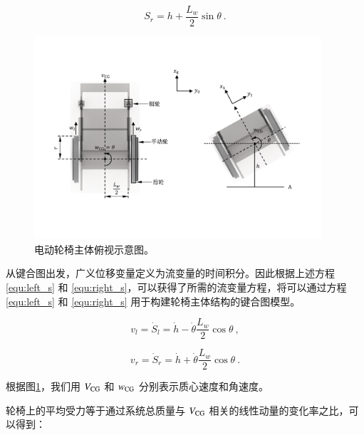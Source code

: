 	\begin{equation}
	\label{equ:right_s}
	S_r = h
	+
	\frac{L_w}{2} \sin \theta
	\ .
	\end{equation}
	
	\begin{figure}[!t]
		\centering
		\includegraphics[width=0.95\textwidth]{fig/top_view.pdf}
		\caption{电动轮椅主体俯视示意图。}\label{fig:top_view}
	\end{figure}
	
	从键合图出发，广义位移变量定义为流变量的时间积分。因此根据上述方程 \ref{equ:left_s} 和 \ref{equ:right_s}，可以获得了所需的流变量方程，将可以通过方程 \ref{equ:left_s} 和 \ref{equ:right_s} 用于构建轮椅主体结构的键合图模型。
	
	\begin{equation}
	\label{equ:left_v}
	v_{l}
	=
	\dot{S}_{l}
	=
	\dot{h}
	-
	\dot{\theta} \frac{L_w}{2} \cos \theta
	\ ,
	\end{equation}
	
	\begin{equation}
	\label{equ:right_v}
	v_{r}
	=
	\dot{S}_{r}
	=
	\dot{h}
	+
	\dot{\theta} \frac{L_w}{2} \cos \theta
	\ .
	\end{equation}
	
	根据图\ref{fig:top_view}，我们用 $ V_{\rm{CG}} $ 和 $ w_{\rm{CG}} $ 分别表示质心速度和角速度。
	
	轮椅上的平均受力等于通过系统总质量与 $ V_{\rm{CG}} $ 相关的线性动量的变化率之比，可以得到：
	
